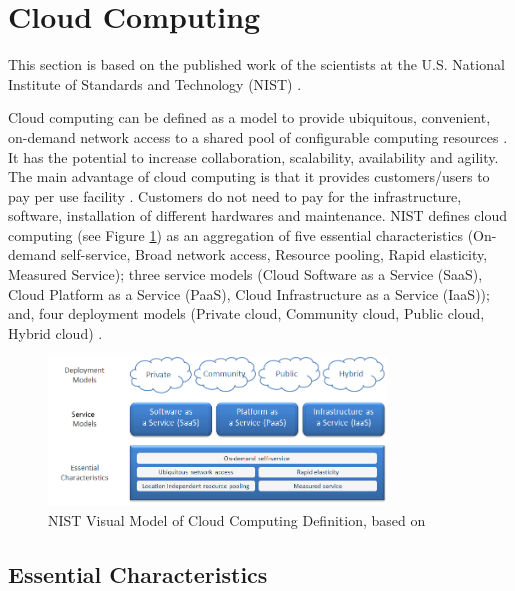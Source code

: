 \documentclass[a4paper,twoside,10pt]{report}
\begin{document}
\section{Cloud Computing} \label{cloudcomp}
This section is based on the published work of the scientists at the U.S. National Institute of Standards and Technology (NIST) \cite{mell2011nist}.

Cloud computing can be defined as a model to provide ubiquitous, convenient, on-demand network access to a shared pool of configurable computing resources \cite{csaguide3.0}. It has the potential to increase collaboration, scalability, availability and agility. The main advantage of cloud computing is that it provides customers/users to pay per use facility \cite{6203873}. Customers do not need to pay for the infrastructure, software, installation of different hardwares and maintenance. NIST defines cloud computing (see Figure \ref{fig:cloud_visual_model}) as an aggregation of five essential characteristics (On-demand self-service, Broad network access, Resource pooling, Rapid elasticity, Measured Service); three service models (Cloud Software as a Service (SaaS), Cloud Platform as a Service (PaaS), Cloud Infrastructure as a Service (IaaS)); and, four deployment models (Private cloud, Community cloud, Public cloud, Hybrid cloud) \cite{mell2011nist}.

\begin{figure}[H]
	\centering
  \includegraphics[width=0.8\textwidth]{Figure/visual_model.png}
  \caption{NIST Visual Model of Cloud Computing Definition, based on \cite{mell2011nist}}
  \label{fig:cloud_visual_model}
\end{figure}

\subsection{Essential Characteristics}
\end{document}
